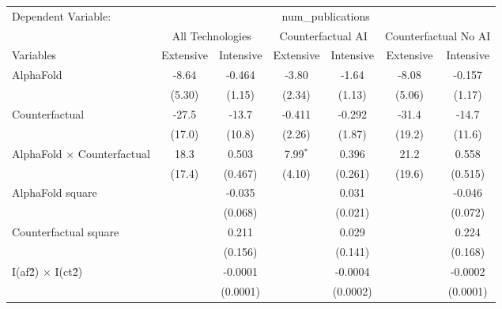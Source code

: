\begingroup
\centering
\begin{tabular}{lcccccc}
   \tabularnewline \midrule \midrule
   Dependent Variable: & \multicolumn{6}{c}{num\_publications}\\
 & \multicolumn{2}{c}{All Technologies} & \multicolumn{2}{c}{Counterfactual AI} & \multicolumn{2}{c}{Counterfactual No AI} \\
\cmidrule(lr){1-1}\cmidrule(lr){2-3} \cmidrule(lr){4-5} \cmidrule(lr){6-7}
Variables & \multicolumn{1}{c}{Extensive} & \multicolumn{1}{c}{Intensive} & \multicolumn{1}{c}{Extensive} & \multicolumn{1}{c}{Intensive} & \multicolumn{1}{c}{Extensive} & \multicolumn{1}{c}{Intensive} \\
\cmidrule(lr){1-1}\cmidrule(lr){2-2} \cmidrule(lr){3-3} \cmidrule(lr){4-4} \cmidrule(lr){5-5} \cmidrule(lr){6-6} \cmidrule(lr){7-7}
   AlphaFold                          & -8.64   & -0.464   & -3.80      & -1.64    & -8.08   & -0.157\\   
                                      & (5.30)  & (1.15)   & (2.34)     & (1.13)   & (5.06)  & (1.17)\\   
   Counterfactual                     & -27.5   & -13.7    & -0.411     & -0.292   & -31.4   & -14.7\\   
                                      & (17.0)  & (10.8)   & (2.26)     & (1.87)   & (19.2)  & (11.6)\\   
   AlphaFold $\times$ Counterfactual  & 18.3    & 0.503    & 7.99$^{*}$ & 0.396    & 21.2    & 0.558\\   
                                      & (17.4)  & (0.467)  & (4.10)     & (0.261)  & (19.6)  & (0.515)\\   
   AlphaFold square                   &         & -0.035   &            & 0.031    &         & -0.046\\   
                                      &         & (0.068)  &            & (0.021)  &         & (0.072)\\   
   Counterfactual square              &         & 0.211    &            & 0.029    &         & 0.224\\   
                                      &         & (0.156)  &            & (0.141)  &         & (0.168)\\   
   I(af\^2) $\times$ I(ct\^2)         &         & -0.0001  &            & -0.0004  &         & -0.0002\\   
                                      &         & (0.0001) &            & (0.0002) &         & (0.0001)\\   

\end{tabular}
